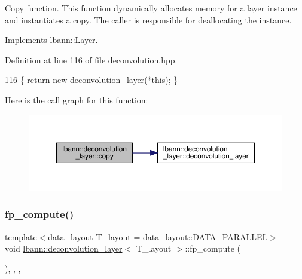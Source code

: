 Copy function. This function dynamically allocates memory for a layer instance and instantiates a copy. The caller is responsible for deallocating the instance. 

Implements \hyperlink{classlbann_1_1Layer_af420f22bbac801c85483ade84588a23f}{lbann\+::\+Layer}.



Definition at line 116 of file deconvolution.\+hpp.


\begin{DoxyCode}
116 \{ \textcolor{keywordflow}{return} \textcolor{keyword}{new} \hyperlink{classlbann_1_1deconvolution__layer_a95350e60a92634952c21b449ea14933d}{deconvolution\_layer}(*\textcolor{keyword}{this}); \}
\end{DoxyCode}
Here is the call graph for this function\+:\nopagebreak
\begin{figure}[H]
\begin{center}
\leavevmode
\includegraphics[width=350pt]{classlbann_1_1deconvolution__layer_aac6d10cbe30d5fcfed0a584321012b3a_cgraph}
\end{center}
\end{figure}
\mbox{\label{classlbann_1_1deconvolution__layer_a6ebbb96c605a96b41fdbbc848dcaa877}} 
\subsubsection{\texorpdfstring{fp\+\_\+compute()}{fp\_compute()}}
{\footnotesize\ttfamily template$<$data\+\_\+layout T\+\_\+layout = data\+\_\+layout\+::\+D\+A\+T\+A\+\_\+\+P\+A\+R\+A\+L\+L\+EL$>$ \\
void \hyperlink{classlbann_1_1deconvolution__layer}{lbann\+::deconvolution\+\_\+layer}$<$ T\+\_\+layout $>$\+::fp\+\_\+compute (\begin{DoxyParamCaption}{ }\end{DoxyParamCaption})\hspace{0.3cm}{\ttfamily [inline]}, {\ttfamily [override]}, {\ttfamily [protected]}, {\ttfamily [virtual]}}

